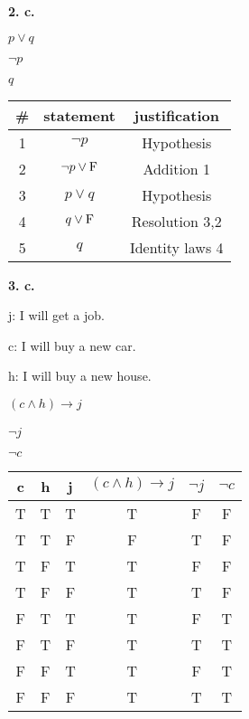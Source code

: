 \documentclass[11pt]{article}
\begin{document}
	\textbf{2. c. }
	\begin{center}
	$p\vee q$
	
	$\neg p$
	
	$q$
	\end{center}
	
	\begin{center}
    \begin{tabular}{||c c c||} 
    \hline
    \# & statement & justification \\ [0.5ex] 
    \hline\hline
    1 & $\neg p$ & Hypothesis \\ 
    \hline
    2 & $\neg p\vee {\rm F}$ & Addition 1 \\
    \hline
    3 & $p\vee q$ & Hypothesis \\
    \hline
    4 & $q\vee {\rm F}$ & Resolution 3,2 \\
    \hline
    5 & $q$ & Identity laws 4 \\
    \hline
    \end{tabular}
    \end{center}
    
    \textbf{3. c. }
	
	j: I will get a job.
	
	c: I will buy a new car.
	
	h: I will buy a new house.
	
	\begin{center}
	$(c\wedge h)\xrightarrow[]{}j$
	
	$\neg j$
	
	$\neg c$
	\end{center}
	
	\begin{center}
    \begin{tabular}{||c c c c c c||} 
    \hline
    c & h & j & $(c\wedge h)\xrightarrow[]{}j$ & $\neg j$ & $\neg c$\\ [0.5ex] 
    \hline\hline
    T & T & T & T & F & F \\ 
    \hline
    T & T & F & F & T & F \\ 
    \hline
    T & F & T & T & F & F \\ 
    \hline
    T & F & F & T & T & F \\ 
    \hline
    F & T & T & T & F & T \\ 
    \hline
    F & T & F & T & T & T \\ 
    \hline
    F & F & T & T & F & T \\ 
    \hline
    F & F & F & T & T & T \\ 
    \hline
    \end{tabular}
    \end{center}
    
\end{document}
